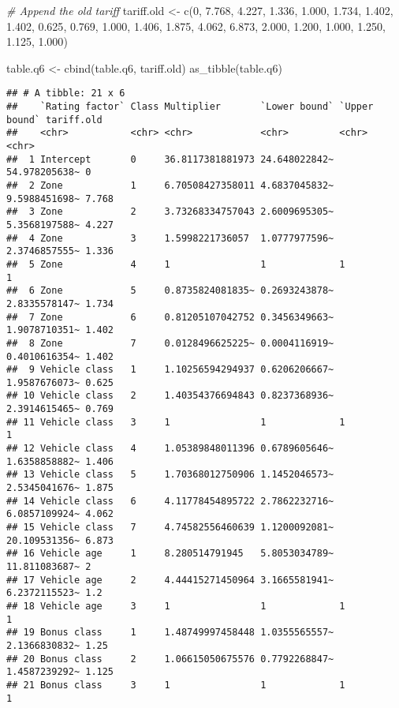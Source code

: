 \documentclass[
]{article}
\newenvironment{Shaded}{\begin{snugshade}}{\end{snugshade}}
\newcommand{\CommentTok}[1]{\textcolor[rgb]{0.56,0.35,0.01}{\textit{#1}}}
\newcommand{\DecValTok}[1]{\textcolor[rgb]{0.00,0.00,0.81}{#1}}
\newcommand{\FloatTok}[1]{\textcolor[rgb]{0.00,0.00,0.81}{#1}}
\newcommand{\FunctionTok}[1]{\textcolor[rgb]{0.00,0.00,0.00}{#1}}
\newcommand{\NormalTok}[1]{#1}
\newcommand{\OtherTok}[1]{\textcolor[rgb]{0.56,0.35,0.01}{#1}}
\begin{document}
\begin{Shaded}
\begin{Highlighting}[]
\CommentTok{\# Append the old tariff}
\NormalTok{tariff.old }\OtherTok{\textless{}{-}} \FunctionTok{c}\NormalTok{(}\DecValTok{0}\NormalTok{, }
                \FloatTok{7.768}\NormalTok{, }\FloatTok{4.227}\NormalTok{, }\FloatTok{1.336}\NormalTok{, }\FloatTok{1.000}\NormalTok{, }\FloatTok{1.734}\NormalTok{, }\FloatTok{1.402}\NormalTok{, }\FloatTok{1.402}\NormalTok{,}
                \FloatTok{0.625}\NormalTok{, }\FloatTok{0.769}\NormalTok{, }\FloatTok{1.000}\NormalTok{, }\FloatTok{1.406}\NormalTok{, }\FloatTok{1.875}\NormalTok{, }\FloatTok{4.062}\NormalTok{, }\FloatTok{6.873}\NormalTok{,}
                \FloatTok{2.000}\NormalTok{, }\FloatTok{1.200}\NormalTok{, }\FloatTok{1.000}\NormalTok{,}
                \FloatTok{1.250}\NormalTok{, }\FloatTok{1.125}\NormalTok{, }\FloatTok{1.000}\NormalTok{)}

\NormalTok{table.q6 }\OtherTok{\textless{}{-}} \FunctionTok{cbind}\NormalTok{(table.q6, tariff.old)}
\FunctionTok{as\_tibble}\NormalTok{(table.q6)}
\end{Highlighting}
\end{Shaded}

\begin{verbatim}
## # A tibble: 21 x 6
##    `Rating factor` Class Multiplier       `Lower bound` `Upper bound` tariff.old
##    <chr>           <chr> <chr>            <chr>         <chr>         <chr>     
##  1 Intercept       0     36.8117381881973 24.648022842~ 54.978205638~ 0         
##  2 Zone            1     6.70508427358011 4.6837045832~ 9.5988451698~ 7.768     
##  3 Zone            2     3.73268334757043 2.6009695305~ 5.3568197588~ 4.227     
##  4 Zone            3     1.5998221736057  1.0777977596~ 2.3746857555~ 1.336     
##  5 Zone            4     1                1             1             1         
##  6 Zone            5     0.8735824081835~ 0.2693243878~ 2.8335578147~ 1.734     
##  7 Zone            6     0.81205107042752 0.3456349663~ 1.9078710351~ 1.402     
##  8 Zone            7     0.0128496625225~ 0.0004116919~ 0.4010616354~ 1.402     
##  9 Vehicle class   1     1.10256594294937 0.6206206667~ 1.9587676073~ 0.625     
## 10 Vehicle class   2     1.40354376694843 0.8237368936~ 2.3914615465~ 0.769     
## 11 Vehicle class   3     1                1             1             1         
## 12 Vehicle class   4     1.05389848011396 0.6789605646~ 1.6358858882~ 1.406     
## 13 Vehicle class   5     1.70368012750906 1.1452046573~ 2.5345041676~ 1.875     
## 14 Vehicle class   6     4.11778454895722 2.7862232716~ 6.0857109924~ 4.062     
## 15 Vehicle class   7     4.74582556460639 1.1200092081~ 20.109531356~ 6.873     
## 16 Vehicle age     1     8.280514791945   5.8053034789~ 11.811083687~ 2         
## 17 Vehicle age     2     4.44415271450964 3.1665581941~ 6.2372115523~ 1.2       
## 18 Vehicle age     3     1                1             1             1         
## 19 Bonus class     1     1.48749997458448 1.0355565557~ 2.1366830832~ 1.25      
## 20 Bonus class     2     1.06615050675576 0.7792268847~ 1.4587239292~ 1.125     
## 21 Bonus class     3     1                1             1             1
\end{verbatim}
\end{document}
